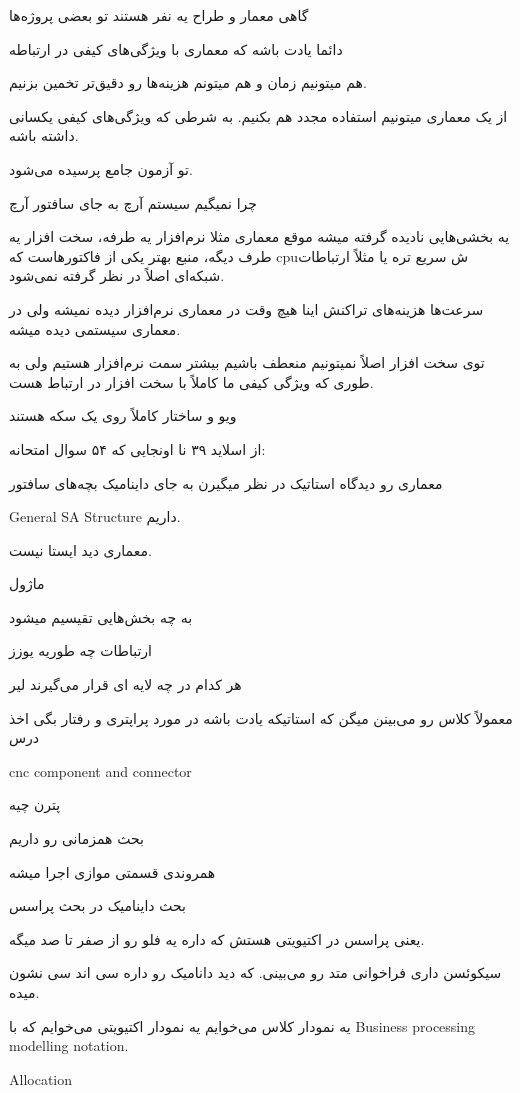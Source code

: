 گاهی معمار و طراح یه نفر هستند تو بعضی پروژه‌ها

دائما یادت باشه که معماری با ویژگی‌های کیفی در ارتباطه

هم میتونیم زمان و هم میتونم هزینه‌ها رو دقیق‌تر تخمین بزنیم.

از یک معماری میتونیم استفاده مجدد هم بکنیم. به شرطی که ویژگی‌های کیفی یکسانی
داشته باشه.

تو آزمون جامع پرسیده می‌شود.

چرا نمیگیم سیستم آرچ به جای سافتور آرچ

یه بخشی‌هایی نادیده گرفته میشه موقع معماری مثلا نرم‌افزار یه طرفه، سخت افزار یه
طرف دیگه، منبع بهتر یکی از فاکتور‌هاست که cpuش سریع تره
یا مثلاً ارتباطات شبکه‌ای اصلاً در نظر گرفته نمی‌شود.

سرعت‌ها هزینه‌های تراکنش اینا هیچ وقت در معماری نرم‌افزار دیده نمیشه ولی در
معماری سیستمی دیده میشه.

توی سخت افزار اصلاً نمیتونیم منعطف باشیم بیشتر سمت نرم‌افزار هستیم ولی به طوری
که ویژگی کیفی ما کاملاً با سخت افزار در ارتباط هست.

ویو و ساختار کاملاً روی یک سکه هستند

از اسلاید ۳۹ نا اونجایی که ۵۴ سوال امتحانه:

معماری رو دیدگاه استاتیک در نظر میگیرن به جای داینامیک بچه‌های سافتور

General SA Structure داریم.

معماری دید ایستا نیست.

ماژول

به چه بخش‌هایی تقیسیم میشود

ارتباطات چه طوریه یوزز

هر کدام در چه لایه ای قرار می‌گیرند لیر

معمولاً کلاس رو می‌بینن میگن که استاتیکه یادت باشه در مورد پراپتری و رفتار بگی اخذ درس

cnc component and connector

پترن چیه

بحث همزمانی رو داریم

همروندی قسمتی موازی اجرا میشه

بحث داینامیک در بحث پراسس

یعنی پراسس در اکتیویتی هستش که داره یه فلو رو از صفر تا صد میگه.

سیکوئسن داری فراخوانی متد رو می‌بینی. که دید دانامیک رو داره سی اند سی نشون
میده.

یه نمودار کلاس می‌خوایم یه نمودار اکتیویتی می‌خوایم که با Business processing
modelling notation.

Allocation

